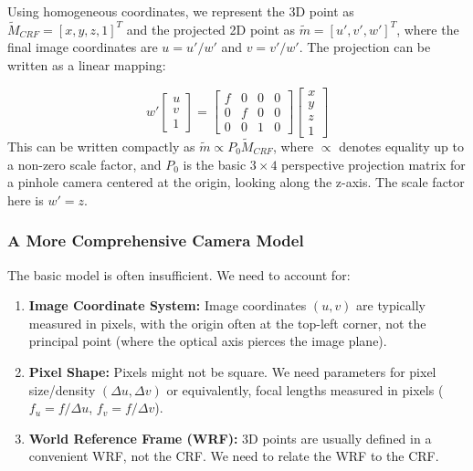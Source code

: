 \documentclass{article}
\begin{document}
Using homogeneous coordinates, we represent the 3D point as $\tilde{M}_{CRF} = [x, y, z, 1]^T$ and the projected 2D point as $\tilde{m} = [u', v', w']^T$, where the final image coordinates are $u = u'/w'$ and $v = v'/w'$. The projection can be written as a linear mapping:

\[
w' %
\begin{bmatrix}
u \\ v \\ 1
\end{bmatrix}
=
\begin{bmatrix}
f & 0 & 0 & 0 \\
0 & f & 0 & 0 \\
0 & 0 & 1 & 0
\end{bmatrix}
\begin{bmatrix}
x \\ y \\ z \\ 1
\end{bmatrix}
\]
This can be written compactly as $\tilde{m} \propto P_0 \tilde{M}_{CRF}$, where $\propto$ denotes equality up to a non-zero scale factor, and $P_0$ is the basic $3 \times 4$ perspective projection matrix for a pinhole camera centered at the origin, looking along the z-axis. The scale factor here is $w'=z$.


\subsubsection{A More Comprehensive Camera Model}

The basic model is often insufficient. We need to account for:
\begin{enumerate}
  \item \textbf{Image Coordinate System:} Image coordinates $(u, v)$ are typically measured in pixels, with the origin often at the top-left corner, not the principal point (where the optical axis pierces the image plane).
  \item \textbf{Pixel Shape:} Pixels might not be square. We need parameters for pixel size/density $(\Delta u, \Delta v)$ or equivalently, focal lengths measured in pixels ($f_u = f/\Delta u$, $f_v = f/\Delta v$).
  \item \textbf{World Reference Frame (WRF):} 3D points are usually defined in a convenient WRF, not the CRF. We need to relate the WRF to the CRF.
\end{enumerate}
\end{document}
